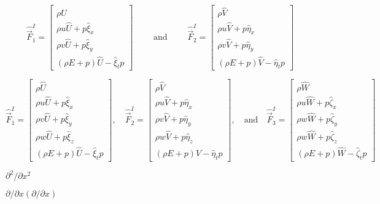 \documentclass{article}
\begin{document}
\[ \hat{\vec{F}}^I_1 = \begin{bmatrix} \rho \hat{U} \\ \rho u \hat{U} + p\hat{\xi}_x \\ \rho v \hat{U} + p \hat{\xi}_y \\ (\rho E + p)\hat{U} - \hat{\xi}_t p \end{bmatrix}\qquad \mbox{ and } \qquad \hat{\vec{F}}^I_2 = \begin{bmatrix} \rho \hat{V} \\ \rho u \hat{V} + p\hat{\eta}_x \\ \rho v \hat{V} + p \hat{\eta}_y \\ (\rho E + p)\hat{V} - \hat{\eta}_t p \end{bmatrix} \]
\pagebreak

\[ \hat{\vec{F}}^I_1 = \begin{bmatrix} \rho \hat{U} \\ \rho u \hat{U} + p\hat{\xi}_x \\ \rho v \hat{U} + p \hat{\xi}_y \\ \rho w \hat{U} + p\hat{\xi}_z \\ (\rho E + p)\hat{U} - \hat{\xi}_t p \end{bmatrix}, \quad \hat{\vec{F}}^I_2 = \begin{bmatrix} \rho \hat{V} \\ \rho u \hat{V} + p\hat{\eta}_x \\ \rho v \hat{V} + p \hat{\eta}_y \\ \rho w \hat{V} + p \hat{\eta}_z \\ (\rho E + p)\hat{V} - \hat{\eta}_t p \end{bmatrix}, \quad \mbox{and} \quad \hat{\vec{F}}^I_3 = \begin{bmatrix} \rho \hat{W} \\ \rho u \hat{W} + p\hat{\zeta}_x \\ \rho w \hat{W} + p \hat{\zeta}_y \\ \rho w \hat{W} + p \hat{\zeta}_z \\ (\rho E + p)\hat{W} - \hat{\zeta}_t p \end{bmatrix} \]
\pagebreak

$\partial^2/\partial x^2$
\pagebreak

$\partial/\partial x\left(\partial/\partial x\right)$
\pagebreak
\end{document}
